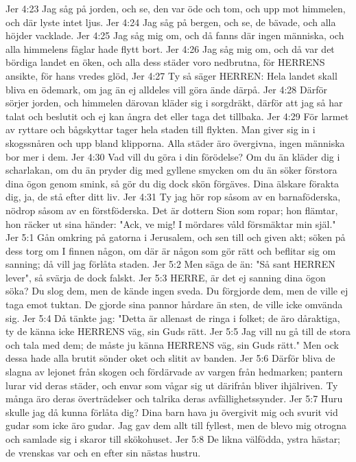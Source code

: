 Jer 4:23  Jag såg på jorden, och se, den var öde och tom, och upp mot himmelen, och där lyste intet ljus.
Jer 4:24  Jag såg på bergen, och se, de bävade, och alla höjder vacklade.
Jer 4:25  Jag såg mig om, och då fanns där ingen människa, och alla himmelens fåglar hade flytt bort.
Jer 4:26  Jag såg mig om, och då var det bördiga landet en öken, och alla dess städer voro nedbrutna, för HERRENS ansikte, för hans vredes glöd,
Jer 4:27  Ty så säger HERREN: Hela landet skall bliva en ödemark, om jag än ej alldeles vill göra ände därpå.
Jer 4:28  Därför sörjer jorden, och himmelen därovan kläder sig i sorgdräkt, därför att jag så har talat och beslutit och ej kan ångra det eller taga det tillbaka.
Jer 4:29  För larmet av ryttare och bågskyttar tager hela staden till flykten. Man giver sig in i skogssnåren och upp bland klipporna. Alla städer äro övergivna, ingen människa bor mer i dem.
Jer 4:30  Vad vill du göra i din förödelse? Om du än kläder dig i scharlakan, om du än pryder dig med gyllene smycken om du än söker förstora dina ögon genom smink, så gör du dig dock skön förgäves. Dina älskare förakta dig, ja, de stå efter ditt liv.
Jer 4:31  Ty jag hör rop såsom av en barnaföderska, nödrop såsom av en förstföderska. Det är dottern Sion som ropar; hon flämtar, hon räcker ut sina händer: "Ack, ve mig! I mördares våld försmäktar min själ."
Jer 5:1  Gån omkring på gatorna i Jerusalem, och sen till och given akt; söken på dess torg om I finnen någon, om där är någon som gör rätt och beflitar sig om sanning; då vill jag förlåta staden.
Jer 5:2  Men säga de än: "Så sant HERREN lever", så svärja de dock falskt.
Jer 5:3  HERRE, är det ej sanning dina ögon söka? Du slog dem, men de kände ingen sveda. Du förgjorde dem, men de ville ej taga emot tuktan. De gjorde sina pannor hårdare än sten, de ville icke omvända sig.
Jer 5:4  Då tänkte jag: "Detta är allenast de ringa i folket; de äro dåraktiga, ty de känna icke HERRENS väg, sin Guds rätt.
Jer 5:5  Jag vill nu gå till de stora och tala med dem; de måste ju känna HERRENS väg, sin Guds rätt." Men ock dessa hade alla brutit sönder oket och slitit av banden.
Jer 5:6  Därför bliva de slagna av lejonet från skogen och fördärvade av vargen från hedmarken; pantern lurar vid deras städer, och envar som vågar sig ut därifrån bliver ihjälriven. Ty många äro deras överträdelser och talrika deras avfällighetssynder.
Jer 5:7  Huru skulle jag då kunna förlåta dig? Dina barn hava ju övergivit mig och svurit vid gudar som icke äro gudar. Jag gav dem allt till fyllest, men de blevo mig otrogna och samlade sig i skaror till skökohuset.
Jer 5:8  De likna välfödda, ystra hästar; de vrenskas var och en efter sin nästas hustru.
